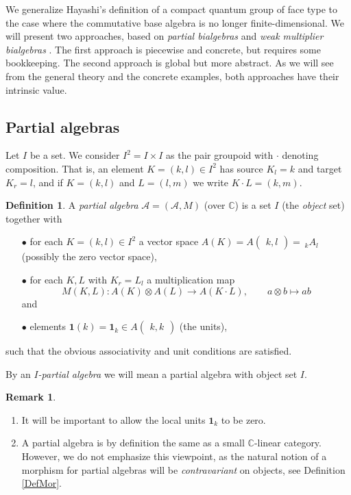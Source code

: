 \documentclass[10pt]{article}
\newcommand{\C}{\mathbb{C}}
\newcommand{\Grs}[3]{#1{\begin{pmatrix} #2,  #3\end{pmatrix}}}
\newcommand{\GrDA}[3]{{}_{\;#2}#1_{#3}} %
\newcommand{\Unit}{\mathbf{1}}
\newcommand{\wmult}{\cdot}
\theoremstyle{definition}
\newtheorem{Def}[Theorem]{Definition}
\newtheorem{Rem}[Theorem]{Remark}
\numberwithin{equation}{section}
\begin{document}
We generalize Hayashi's definition of a compact quantum group of face type \cite{Hay1} to the case where the commutative base algebra is no longer finite-dimensional. We will present two approaches, based on \emph{partial bialgebras} and \emph{weak multiplier bialgebras} \cite{Boh1,VDW1}. The first approach is piecewise and concrete, but requires some bookkeeping. The second approach is global but more abstract. As we will see from the general theory and the concrete examples, both approaches have their intrinsic value.

\subsection{Partial algebras}

Let $I$ be a set. We consider $I^2=I\times I$ as the pair groupoid with $\wmult$ denoting composition. That is, an element $K=(k,l)\in I^2$ has source $K_l = k$ and target $K_r=l$, and if $K=(k,l)$ and $L=(l,m)$ we write $K\wmult L = (k,m)$. 

\begin{Def} A \emph{partial algebra} $\mathscr{A}=(\mathscr{A},M)$ (over $\C$) is a set $I$ (the \emph{object} set) together with 
\begin{itemize}
\item[$\bullet$] for each $K=(k,l)\in I^2$ a vector space $A(K) = \Grs{A}{k}{l}=\!\!\GrDA{A}{k}{l}$ (possibly the zero vector space),
\item[$\bullet$] for each $K,L$ with $K_r = L_l$ a multiplication map \[M(K,L):A(K) \otimes A(L)\rightarrow A(K\cdot L),\qquad a\otimes b \mapsto ab\]  and 
\item[$\bullet$] elements $\Unit(k) = \Unit_k \in \Grs{A}{k}{k}$ (the units), %
\end{itemize}
such that the obvious associativity and unit conditions are satisfied. 

By an \emph{$I$-partial algebra} we will mean a partial algebra with object set $I$.
\end{Def}

\begin{Rem}
\begin{enumerate}\item It will be important to allow the local units $\Unit_k$ to be zero.
\item A partial algebra is by definition the same as a small
  $\C$-linear category. However, we do not emphasize this viewpoint,
  as the natural notion of a morphism for partial algebras will be \emph{contravariant} on objects, see Definition \ref{DefMor}.%
\end{enumerate}
\end{Rem}
\end{document}
